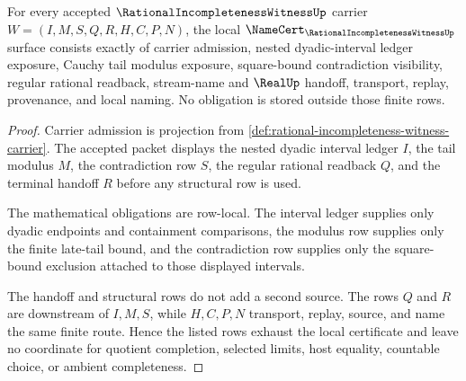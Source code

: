 \begin{theorem}
\label{thm:rational-incompleteness-witness-namecert-obligations}
For every accepted $\RationalIncompletenessWitnessUp$ carrier $W=(I,M,S,Q,R,H,C,P,N)$, the local $\NameCert_{\RationalIncompletenessWitnessUp}$ surface consists exactly of carrier admission, nested dyadic-interval ledger exposure, Cauchy tail modulus exposure, square-bound contradiction visibility, regular rational readback, stream-name and $\RealUp$ handoff, transport, replay, provenance, and local naming. No obligation is stored outside those finite rows.
\end{theorem}
\begin{proof}
Carrier admission is projection from \autoref{def:rational-incompleteness-witness-carrier}. The accepted packet displays the nested dyadic interval ledger $I$, the tail modulus $M$, the contradiction row $S$, the regular rational readback $Q$, and the terminal handoff $R$ before any structural row is used.

The mathematical obligations are row-local. The interval ledger supplies only dyadic endpoints and containment comparisons, the modulus row supplies only the finite late-tail bound, and the contradiction row supplies only the square-bound exclusion attached to those displayed intervals.

The handoff and structural rows do not add a second source. The rows $Q$ and $R$ are downstream of $I,M,S$, while $H,C,P,N$ transport, replay, source, and name the same finite route. Hence the listed rows exhaust the local certificate and leave no coordinate for quotient completion, selected limits, host equality, countable choice, or ambient completeness.
\end{proof}

